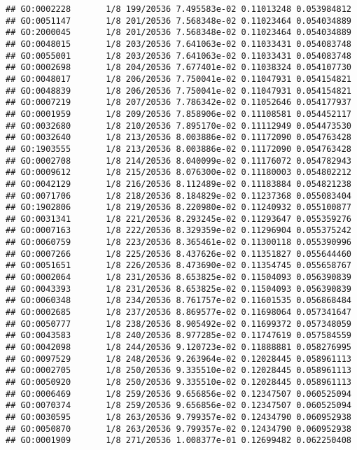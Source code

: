 \documentclass[
]{article}
\begin{document}
\begin{verbatim}
## GO:0002228       1/8 199/20536 7.495583e-02 0.11013248 0.053984812
## GO:0051147       1/8 201/20536 7.568348e-02 0.11023464 0.054034889
## GO:2000045       1/8 201/20536 7.568348e-02 0.11023464 0.054034889
## GO:0048015       1/8 203/20536 7.641063e-02 0.11033431 0.054083748
## GO:0055001       1/8 203/20536 7.641063e-02 0.11033431 0.054083748
## GO:0002698       1/8 204/20536 7.677401e-02 0.11038324 0.054107730
## GO:0048017       1/8 206/20536 7.750041e-02 0.11047931 0.054154821
## GO:0048839       1/8 206/20536 7.750041e-02 0.11047931 0.054154821
## GO:0007219       1/8 207/20536 7.786342e-02 0.11052646 0.054177937
## GO:0001959       1/8 209/20536 7.858906e-02 0.11108581 0.054452117
## GO:0032680       1/8 210/20536 7.895170e-02 0.11112949 0.054473530
## GO:0032640       1/8 213/20536 8.003886e-02 0.11172090 0.054763428
## GO:1903555       1/8 213/20536 8.003886e-02 0.11172090 0.054763428
## GO:0002708       1/8 214/20536 8.040099e-02 0.11176072 0.054782943
## GO:0009612       1/8 215/20536 8.076300e-02 0.11180003 0.054802212
## GO:0042129       1/8 216/20536 8.112489e-02 0.11183884 0.054821238
## GO:0071706       1/8 218/20536 8.184829e-02 0.11237368 0.055083404
## GO:1902806       1/8 219/20536 8.220980e-02 0.11240932 0.055100877
## GO:0031341       1/8 221/20536 8.293245e-02 0.11293647 0.055359276
## GO:0007163       1/8 222/20536 8.329359e-02 0.11296904 0.055375242
## GO:0060759       1/8 223/20536 8.365461e-02 0.11300118 0.055390996
## GO:0007266       1/8 225/20536 8.437626e-02 0.11351827 0.055644460
## GO:0051651       1/8 226/20536 8.473690e-02 0.11354745 0.055658767
## GO:0002064       1/8 231/20536 8.653825e-02 0.11504093 0.056390839
## GO:0043393       1/8 231/20536 8.653825e-02 0.11504093 0.056390839
## GO:0060348       1/8 234/20536 8.761757e-02 0.11601535 0.056868484
## GO:0002685       1/8 237/20536 8.869577e-02 0.11698064 0.057341647
## GO:0050777       1/8 238/20536 8.905492e-02 0.11699372 0.057348059
## GO:0043583       1/8 240/20536 8.977285e-02 0.11747619 0.057584559
## GO:0042098       1/8 244/20536 9.120723e-02 0.11888881 0.058276995
## GO:0097529       1/8 248/20536 9.263964e-02 0.12028445 0.058961113
## GO:0002705       1/8 250/20536 9.335510e-02 0.12028445 0.058961113
## GO:0050920       1/8 250/20536 9.335510e-02 0.12028445 0.058961113
## GO:0006469       1/8 259/20536 9.656856e-02 0.12347507 0.060525094
## GO:0070374       1/8 259/20536 9.656856e-02 0.12347507 0.060525094
## GO:0030595       1/8 263/20536 9.799357e-02 0.12434790 0.060952938
## GO:0050870       1/8 263/20536 9.799357e-02 0.12434790 0.060952938
## GO:0001909       1/8 271/20536 1.008377e-01 0.12699482 0.062250408

\end{verbatim}
\end{document}
